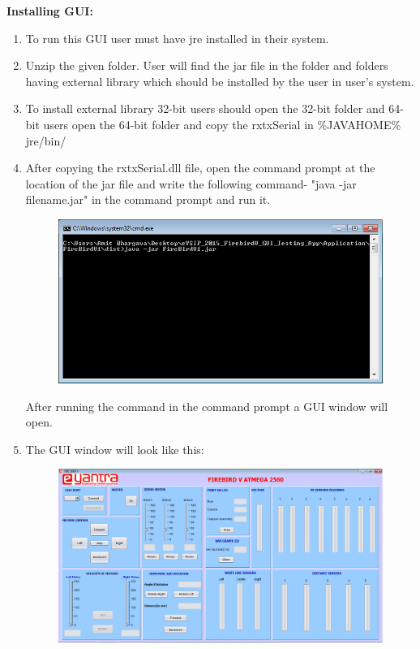 \documentclass{article}
\begin{document}
	\textbf{\large Installing GUI:}
	\begin{enumerate}
		\item To run this GUI user must have jre installed in their system.
		\item Unzip the given folder. User will find the jar file in the folder and folders having external library which should be installed by the user in user's system. 
		\item To install external library 32-bit users should open the 32-bit folder and 64-bit users open the 64-bit folder and copy the rxtxSerial in \%JAVAHOME\% jre/bin/ \\
		\item After copying the rxtxSerial.dll file, open the command prompt at the location of the jar file and write the following command- "java -jar filename.jar" in the command prompt and run it. \\
		\begin{figure}[h]
			\begin{center}
				\includegraphics[scale=0.5]{cmd.png}
			\end{center}
		\end{figure}
		After running the command in the command prompt a GUI window will open.
		\item The GUI window will look like this:
		\begin{figure}[h]
			\begin{center}
				\includegraphics[scale=0.5]{GUI.png}

\end{center}
\end{figure}
\end{enumerate}
\end{document}
